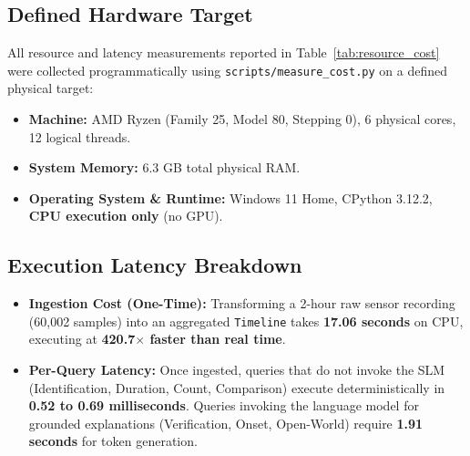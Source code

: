 \documentclass[11pt,a4paper]{article}
\begin{document}
\subsection{Defined Hardware Target}
All resource and latency measurements reported in Table~\ref{tab:resource_cost} were collected programmatically using \texttt{scripts/measure\_cost.py} on a defined physical target:
\begin{itemize}[noitemsep,topsep=1pt]
  \item \textbf{Machine:} AMD Ryzen (Family 25, Model 80, Stepping 0), 6 physical cores, 12 logical threads.
  \item \textbf{System Memory:} 6.3 GB total physical RAM.
  \item \textbf{Operating System \& Runtime:} Windows 11 Home, CPython 3.12.2, \textbf{CPU execution only} (no GPU).
\end{itemize}

\subsection{Execution Latency Breakdown}
\begin{itemize}[noitemsep,topsep=1pt]
  \item \textbf{Ingestion Cost (One-Time):} Transforming a 2-hour raw sensor recording (60,002 samples) into an aggregated \texttt{Timeline} takes \textbf{17.06 seconds} on CPU, executing at \textbf{420.7$\times$ faster than real time}.
  \item \textbf{Per-Query Latency:} Once ingested, queries that do not invoke the SLM (Identification, Duration, Count, Comparison) execute deterministically in \textbf{0.52 to 0.69 milliseconds}. Queries invoking the language model for grounded explanations (Verification, Onset, Open-World) require \textbf{1.91 seconds} for token generation.
\end{itemize}
\end{document}
